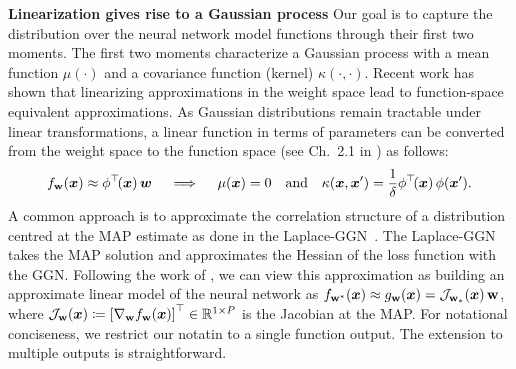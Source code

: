 \documentclass{article} %
\newcommand{\weights}{\ensuremath{\mathbf{w}}}
\newcommand{\T}{\top}
\newcommand{\Jac}[2]{\mathcal{J}_{#1}(#2)}
\begin{document}
\textbf{Linearization gives rise to a Gaussian process}
Our goal is to capture the distribution over the neural network model functions through their first two moments. The first two moments characterize a Gaussian process with a mean function $\mu(\cdot)$ and a covariance function (kernel) $\kappa(\cdot,\cdot)$.
Recent work \cite{khan2019approximate,maddox2021fast} has shown that linearizing approximations in the weight space lead to function-space equivalent approximations.
As Gaussian distributions remain tractable under linear transformations, a linear function in terms of parameters can be converted from the weight space to the function space (see Ch.~2.1 in \cite{rasmussen2006gaussian}) as follows:
%
\begin{equation} \label{eq:weight_func}
f_\weights(\vx) \approx
\phi^\top\!(\vx) \, \vw \quad\implies\quad \mu(\vx) = 0 \quad \text{and} \quad \kappa(\vx, \vx') = \frac{1}{\delta} \phi^\T\!(\vx) \, \phi(\vx').
\end{equation}
A common approach is to approximate the correlation structure of a distribution centred at the MAP estimate as done in the Laplace-GGN~\cite{khan2019approximate, daxberger2021laplace, maddox2021fast}.
The Laplace-GGN takes the MAP solution and approximates the Hessian of the loss function
with the GGN.
Following the work of \citet{khan2019approximate}, we can view this approximation as building an approximate linear model of the neural network as $f_{\weights^*}(\vx) \approx
g_{\weights}(\vx) =
\Jac{\weights_*}{\vx} \, \weights$, where $\Jac{\weights}{\vx} \coloneqq \left[ \nabla_\weights f_\weights(\vx)\right]^\top \in \R^{1 \times P}$ is the Jacobian at the MAP.
For notational conciseness, we %
restrict our notatin to a single function output. The extension to multiple outputs is straightforward.
\end{document}
